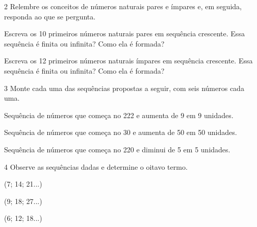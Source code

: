 \num{2} Relembre os conceitos de números naturais pares e ímpares e, em seguida,
responda ao que se pergunta.

\begin{escolha}
\item
  Escreva os 10 primeiros números naturais pares em sequência crescente.
  Essa sequência é finita ou infinita? Como ela é formada?

\item
  Escreva os 12 primeiros números naturais ímpares em sequência
  crescente. Essa sequência é finita ou infinita? Como ela é formada?
\end{escolha}


\pagebreak
\num{3} Monte cada uma das sequências propostas a seguir, com seis números cada uma.

\begin{escolha}
\item
  Sequência de números que começa no 222 e aumenta de 9 em 9 unidades.

\item
  Sequência de números que começa no 30 e aumenta de 50 em 50 unidades.

\item
  Sequência de números que começa no 220 e diminui de 5 em 5 unidades.
\end{escolha}


\num{4} Observe as sequências dadas e determine o oitavo termo.

\begin{escolha}
  \item (7; 14; 21...) 

  \item (9; 18; 27...) 

  \item (6; 12; 18...) 
  \end{escolha}


